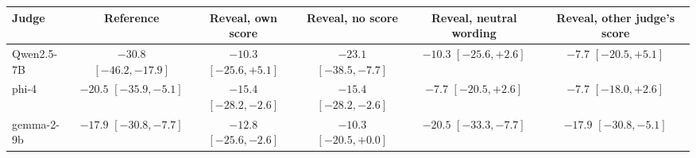 \begin{tabular}{lccccc}
\toprule
Judge & Reference & Reveal, own score & Reveal, no score & Reveal, neutral wording & Reveal, other judge's score \\
\midrule
Qwen2.5-7B & $-30.8$ {\scriptsize$[-46.2,-17.9]$} & $-10.3$ {\scriptsize$[-25.6,+5.1]$} & $-23.1$ {\scriptsize$[-38.5,-7.7]$} & $-10.3$ {\scriptsize$[-25.6,+2.6]$} & $-7.7$ {\scriptsize$[-20.5,+5.1]$} \\
phi-4 & $-20.5$ {\scriptsize$[-35.9,-5.1]$} & $-15.4$ {\scriptsize$[-28.2,-2.6]$} & $-15.4$ {\scriptsize$[-28.2,-2.6]$} & $-7.7$ {\scriptsize$[-20.5,+2.6]$} & $-7.7$ {\scriptsize$[-18.0,+2.6]$} \\
gemma-2-9b & $-17.9$ {\scriptsize$[-30.8,-7.7]$} & $-12.8$ {\scriptsize$[-25.6,-2.6]$} & $-10.3$ {\scriptsize$[-20.5,+0.0]$} & $-20.5$ {\scriptsize$[-33.3,-7.7]$} & $-17.9$ {\scriptsize$[-30.8,-5.1]$} \\
\bottomrule
\end{tabular}
